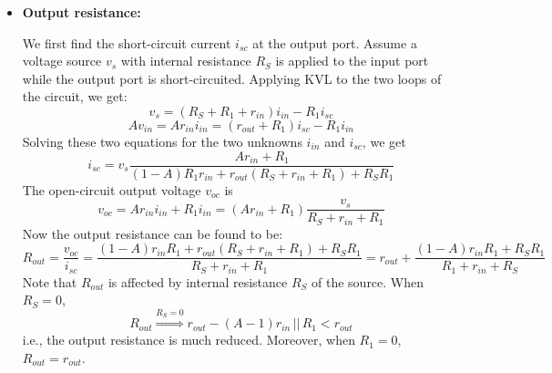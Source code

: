 \begin{itemize}
\begin{itemize}
\item {\bf Output resistance:} 
  \begin{comment}
  We first find the short-circuit current $i_{sc}$ at the output port. 
  Assume a voltage source $v_s$ with $R_S=0$ is applied to the input 
  port while the output port is short-circuited. Applying KVL to the 
  two loops of the circuit, we get:
  \begin{eqnarray}
    v_s&=&(R_1+r_{in})i_{in}-R_1 i_{sc} 
    \nonumber\\
    A v_{in}&=&A r_{in} i_{in}=(r_{out}+R_1) i_{sc}-R_1 i_{in} 
    \nonumber
  \end{eqnarray}
  Solving these two equations for the two unknowns $i_{in}$ and $i_{sc}$, 
  we get
  \[
  i_{sc}=v_s \frac{Ar_{in}+R_1}{(1-A)R_1 r_{in} +r_{out}(r_{in}+R_1)}
  \]
  The open-circuit output voltage $v_{oc}$ is 
  \[
  v_{oc}=Ar_{in}i_{in}+R_1i_{in}=(Ar_{in}+R_1)\frac{v_s}{r_{in}+R_1} 
  \]
  Now the output resistance can be found to be:
  \begin{eqnarray}
  R_{out}&=&\frac{v_{oc}}{i_{sc}}
  =\frac{(1-A)r_{in}R_1+r_{out}(r_{in}+R_1)}{r_{in}+R_1}
  \nonumber\\
  &=&r_{out}-\frac{(A-1) r_{in}R_1}{R_1+r_{in}}
  \approx r_{out}-A\;r_{in}||R_1<r_{out}
  \nonumber
  \end{eqnarray}
  i.e., the output resistance is much reduced. Moreover, when $R_1=0$, 
  $R_{out}=r_{out}$.
  \end{comment}

  We first find the short-circuit current $i_{sc}$ 
  at the output port. Assume a voltage source $v_s$ with internal resistance 
  $R_S$ is applied to the input port while the output port is short-circuited.
  Applying KVL to the two loops of the circuit, we get:
  \[ v_s=(R_S+R_1+r_{in})i_{in}-R_1 i_{sc} \]
  \[ A v_{in}=A r_{in} i_{in}=(r_{out}+R_1) i_{sc}-R_1 i_{in} \]
  Solving these two equations for the two unknowns $i_{in}$ and $i_{sc}$, we get
  \[ 
  i_{sc}=v_s \frac{Ar_{in}+R_1}{(1-A)R_1 r_{in} +r_{out}(R_S+r_{in}+R_1)+R_SR_1} 
  \]
  The open-circuit output voltage $v_{oc}$ is 
  \[ v_{oc}=Ar_{in}i_{in}+R_1i_{in}=(Ar_{in}+R_1)\frac{v_s}{R_S+r_{in}+R_1} \]
  Now the output resistance can be found to be:
  \[ R_{out}=\frac{v_{oc}}{i_{sc}}
  =\frac{(1-A)r_{in}R_1+r_{out}(R_S+r_{in}+R_1)+R_SR_1}{R_S+r_{in}+R_1}
  =r_{out}+\frac{(1-A) r_{in}R_1 +R_SR_1}{R_1+r_{in}+R_S}\]
  Note that $R_{out}$ is affected by internal resistance $R_S$ of the source.
  When $R_S=0$, 
  \[
  R_{out}\stackrel{R_S=0}{\Longrightarrow} r_{out}-(A-1) r_{in}\,||\,R_1 < r_{out} 
  \]
  i.e., the output resistance is much reduced. Moreover, when $R_1=0$, 
  $R_{out}=r_{out}$.


\end{itemize}
\end{itemize}
